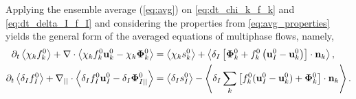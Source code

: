 Applying the ensemble average (\ref{eq:avg}) on \ref{eq:dt_chi_k_f_k} and \ref{eq:dt_delta_I_f_I} and considering the properties from \ref{eq:avg_properties} yields the general form of the averaged equations of multiphase flows, namely,
\begin{align}
    \partial_t \left<\chi_k f_k^0\right>
    +\mathbf{\nabla}\cdot \left<\chi_k f_k^0 \textbf{u}_k^0 - \chi_k \mathbf{\Phi}_k^0\right>
    &= 
    \left<\chi_k s_k^0\right>
    + \left<\delta_I\left[
        \mathbf{\Phi}_k^0
        + f_k^0
        \left(
            \textbf{u}_I^0
            - \textbf{u}_k^0
        \right)
    \right]
    \cdot \textbf{n}_k\right> ,
    \label{eq:avg_dt_chi_f}\\
    \partial_t \left<\delta_If_I^0\right>
    +\mathbf{\nabla}_{||}\cdot \left<\delta_I f_I^0 \textbf{u}_I^0-\delta_I \mathbf{\Phi}_{I||}^0 \right>
    &= 
    \left<\delta_Is_I^0\right> 
    - \left<\delta_I 
    \sum_k \left[
    f_k^0 (\textbf{u}_I^0 - \textbf{u}_k^0)
    + \mathbf{\Phi}_k^0
    \right] \cdot \textbf{n}_k 
     \right>.
    \label{eq:avg_dt_delta_f}
\end{align}



